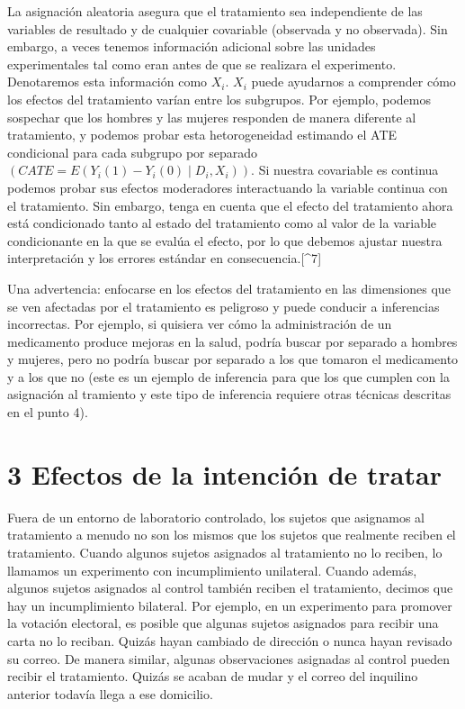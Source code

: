 \documentclass[
]{article}
\begin{document}
La asignación aleatoria asegura que el tratamiento sea independiente de
las variables de resultado y de cualquier covariable (observada y no
observada). Sin embargo, a veces tenemos información adicional sobre las
unidades experimentales tal como eran antes de que se realizara el
experimento. Denotaremos esta información como \(X_{i}\). \(X_{i}\)
puede ayudarnos a comprender cómo los efectos del tratamiento varían
entre los subgrupos. Por ejemplo, podemos sospechar que los hombres y
las mujeres responden de manera diferente al tratamiento, y podemos
probar esta hetorogeneidad estimando el ATE condicional para cada
subgrupo por separado
\((CATE = E (Y_{i} (1) -Y_{i} (0)∣D_ {i}, X_{i}))\). Si nuestra
covariable es continua podemos probar sus efectos moderadores
interactuando la variable continua con el tratamiento. Sin embargo,
tenga en cuenta que el efecto del tratamiento ahora está condicionado
tanto al estado del tratamiento como al valor de la variable
condicionante en la que se evalúa el efecto, por lo que debemos ajustar
nuestra interpretación y los errores estándar en
consecuencia.{[}\^{}7{]}

Una advertencia: enfocarse en los efectos del tratamiento en las
dimensiones que se ven afectadas por el tratamiento es peligroso y puede
conducir a inferencias incorrectas. Por ejemplo, si quisiera ver cómo la
administración de un medicamento produce mejoras en la salud, podría
buscar por separado a hombres y mujeres, pero no podría buscar por
separado a los que tomaron el medicamento y a los que no (este es un
ejemplo de inferencia para que los que cumplen con la asignación al
tramiento y este tipo de inferencia requiere otras técnicas descritas en
el punto 4).

\hypertarget{efectos-de-la-intenciuxf3n-de-tratar}{%
\section{3 Efectos de la intención de
tratar}\label{efectos-de-la-intenciuxf3n-de-tratar}}

Fuera de un entorno de laboratorio controlado, los sujetos que asignamos
al tratamiento a menudo no son los mismos que los sujetos que realmente
reciben el tratamiento. Cuando algunos sujetos asignados al tratamiento
no lo reciben, lo llamamos un experimento con incumplimiento unilateral.
Cuando además, algunos sujetos asignados al control también reciben el
tratamiento, decimos que hay un incumplimiento bilateral. Por ejemplo,
en un experimento para promover la votación electoral, es posible que
algunas sujetos asignados para recibir una carta no lo reciban. Quizás
hayan cambiado de dirección o nunca hayan revisado su correo. De manera
similar, algunas observaciones asignadas al control pueden recibir el
tratamiento. Quizás se acaban de mudar y el correo del inquilino
anterior todavía llega a ese domicilio.
\end{document}
